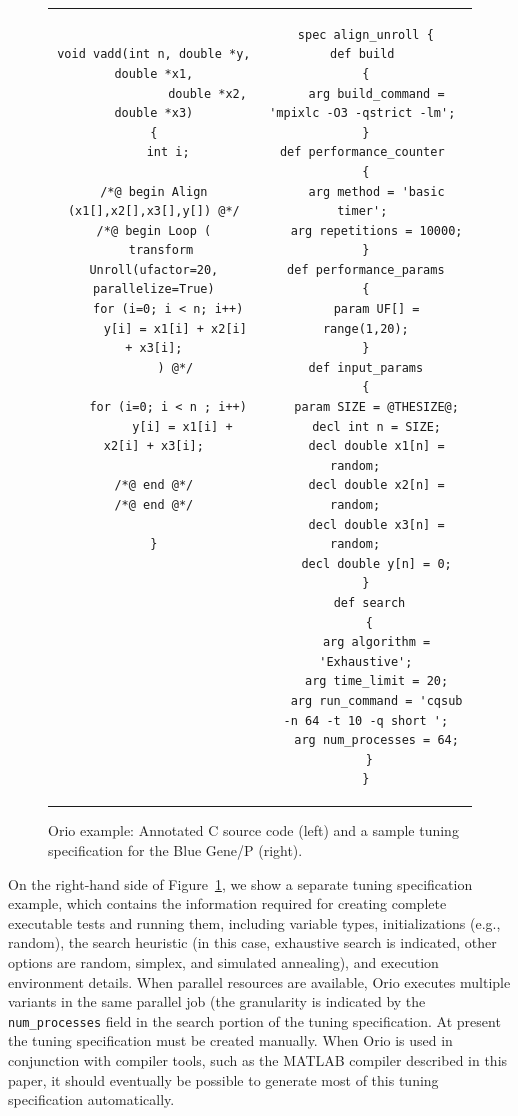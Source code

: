 \documentclass[11pt]{article}
\begin{document}
\begin{figure}[htp]
\centering
\begin{tabular}{cc}
\begin{minipage}[b]{.45\textwidth}
\scriptsize
\begin{verbatim}
void vadd(int n, double *y, double *x1,
               double *x2, double *x3)
{
    int i;

/*@ begin Align (x1[],x2[],x3[],y[]) @*/
/*@ begin Loop (
  transform Unroll(ufactor=20, parallelize=True)
    for (i=0; i < n; i++)
      y[i] = x1[i] + x2[i] + x3[i];
      ) @*/

    for (i=0; i < n ; i++)
        y[i] = x1[i] + x2[i] + x3[i];

/*@ end @*/
/*@ end @*/

}












\end{verbatim}
\end{minipage}
&
\begin{minipage}[b]{.45\textwidth}
\scriptsize
\begin{verbatim}
spec align_unroll {
 def build  
 { 
   arg build_command = 'mpixlc -O3 -qstrict -lm'; 
 } 
 def performance_counter  
 { 
   arg method = 'basic timer'; 
   arg repetitions = 10000;
 } 
 def performance_params 
 { 
   param UF[] = range(1,20);
 } 
 def input_params 
 { 
   param SIZE = @THESIZE@;
   decl int n = SIZE;
   decl double x1[n] = random;   
   decl double x2[n] = random;   
   decl double x3[n] = random;   
   decl double y[n] = 0;
 } 
 def search
 {
   arg algorithm = 'Exhaustive';
   arg time_limit = 20;
   arg run_command = 'cqsub -n 64 -t 10 -q short ';
   arg num_processes = 64;
 }
}
\end{verbatim}
\end{minipage}\\
\end{tabular}
\caption{Orio example: Annotated C source code (left) and a sample tuning specification for the Blue Gene/P (right).}
\label{fig:orio-example}
\end{figure}

On the right-hand side of Figure~\ref{fig:orio-example}, we show a separate tuning specification example, which contains the information required for creating complete executable tests and running them, including variable types, initializations (e.g., random), the search heuristic (in this case, exhaustive search is indicated, other options are random, simplex, and simulated annealing), and execution environment details. When parallel resources are available, Orio executes multiple variants in the same parallel job (the granularity is indicated by the \texttt{num\_processes} field in the search portion of the tuning specification. At present the tuning specification must be created manually. When Orio is used in conjunction with compiler tools, such as the MATLAB compiler described in this paper, it should eventually be possible to generate most of this tuning specification automatically.
\end{document}
